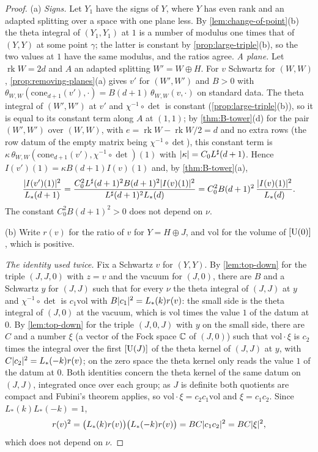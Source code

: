 \begin{proof}
(a) \emph{Signs.} Let $Y_1$ have the signs of $Y$, where $Y$ has even rank and an adapted splitting over a space with one plane less. By \cref{lem:change-of-point}(b) the theta integral of $(Y_1,Y_1)$ at $1$ is a
number of modulus one times that of $(Y,Y)$ at some point $\gamma$; the latter is constant by \cref{prop:large-triple}(b), so the two values at $1$ have the same modulus, and the ratios agree. \emph{A plane.} Let
$\operatorname{rk}W=2d$ and $A$ an adapted splitting $W'=W\oplus H$. For $v$ Schwartz for $(W,W)$, \cref{prop:removing-planes}(a) gives $v'$ for $(W',W')$ and $B>0$ with
$\theta_{W,W}(\mathrm{cone}_{d+1}(v'),\cdot)=B(d+1)\,\theta_{W,W}(v,\cdot)$ on standard data. The theta integral of $(W',W')$ at $v'$ and $\chi^{-1}\circ\det$ is constant (\cref{prop:large-triple}(b)), so it is equal to
its constant term along $A$ at $(1,1)$; by \cref{thm:B-tower}(d) for the pair $(W',W')$ over $(W,W)$, with $e=\operatorname{rk}W-\operatorname{rk}W/2=d$ and no extra rows (the row datum of the empty matrix being
$\chi^{-1}\circ\det$), this constant term is $\kappa\,\theta_{W,W}(\mathrm{cone}_{d+1}(v'),\chi^{-1}\circ\det)(1)$ with $\lvert \kappa\rvert=C_0L^\sharp(d+1)$. Hence $I(v')(1)=\kappa B(d+1)I(v)(1)$ and, by \cref{thm:B-tower}(a),
\[
  \frac{\lvert I(v')(1)\rvert^2}{L_*(d+1)}=\frac{C_0^2L^\sharp(d+1)^2B(d+1)^2\lvert I(v)(1)\rvert^2}{L^\sharp(d+1)^2L_*(d)}=C_0^2B(d+1)^2\,\frac{\lvert I(v)(1)\rvert^2}{L_*(d)}.
\]
The constant $C_0^2B(d+1)^2>0$ does not depend on $\nu$.

(b) Write $r(v)$ for the ratio of $v$ for $Y=H\oplus J$, and $\mathrm{vol}$ for the volume of $[\operatorname{U}(0)]$, which is positive.

\emph{The identity used twice.} Fix a Schwartz $v$ for $(Y,Y)$. By \cref{lem:top-down} for the triple $(J,J,0)$ with $z=v$ and the vacuum for $(J,0)$, there are $B$ and a Schwartz $y$ for $(J,J)$ such that for every
$\nu$ the theta integral of $(J,J)$ at $y$ and $\chi^{-1}\circ\det$ is $c_1\mathrm{vol}$ with $B\lvert c_1\rvert^2=L_*(k)r(v)$: the small side is the theta integral of $(J,0)$ at the vacuum, which is $\mathrm{vol}$ times the value
$1$ of the datum at $0$. By \cref{lem:top-down} for the triple $(J,0,J)$ with $y$ on the small side, there are $C$ and a number $\xi$ (a vector of the Fock space $\mathbb{C}$ of $(J,0)$) such that $\mathrm{vol}\cdot\xi$ is $c_2$
times the integral over the first $[\operatorname{U}(J)]$ of the theta kernel of $(J,J)$ at $y$, with $C\lvert c_2\rvert^2=L_*(-k)r(v)$; on the zero space the theta kernel only reads the value $1$ of the datum at $0$. Both identities
concern the theta kernel of the same datum on $(J,J)$, integrated once over each group; as $J$ is definite both quotients are compact and Fubini's theorem applies, so $\mathrm{vol}\cdot\xi=c_2c_1\mathrm{vol}$ and
$\xi=c_1c_2$. Since $L_*(k)L_*(-k)=1$,
\[
  r(v)^2=\bigl(L_*(k)r(v)\bigr)\bigl(L_*(-k)r(v)\bigr)=BC\lvert c_1c_2\rvert^2=BC\lvert \xi\rvert^2,
\]
which does not depend on $\nu$.


\end{proof}
